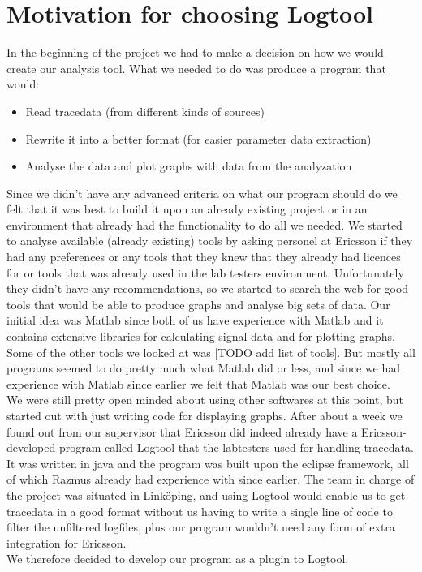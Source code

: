 \documentclass[cropmarks, frame, english]{idamasterthesis}
\begin{document}
\section{Motivation for choosing Logtool}
In the beginning of the project we had to make a decision on how we would create our analysis tool.
What we needed to do was produce a program that would:
\begin{itemize}
\item Read tracedata (from different kinds of sources)
\item Rewrite it into a better format (for easier parameter data extraction)
\item  Analyse the data and plot graphs with data from the analyzation
\end{itemize} 
Since we didn't have any advanced criteria on what our program should do we felt that it was best to build it upon an already existing project or in an environment that already had the functionality to do all we needed. \newline
We started to analyse available (already existing) tools by asking personel at Ericsson if they had any preferences or any tools that they knew that they already had licences for or tools that was already used in the lab testers environment. Unfortunately they didn't have any recommendations, so we started to search the web for good tools that would be able to produce graphs and analyse big sets of data. Our initial idea was Matlab since both of us have experience with Matlab and it contains extensive libraries for calculating signal data and for plotting graphs. Some of the other tools we looked at was [TODO add list of tools]. But mostly all programs seemed to do pretty much what Matlab did or less, and since we had experience with Matlab since earlier we felt that Matlab was our best choice. \\
We were still pretty open minded about using other softwares at this point, but started out with just writing code for displaying graphs. After about a week we found out from our supervisor that Ericsson did indeed already have a Ericsson-developed program called Logtool that the labtesters used for handling tracedata. It was written in java and the program was built upon the eclipse framework, all of which Razmus already had experience with since earlier. The team in charge of the project was situated in Linköping, and using Logtool would enable us to get tracedata in a good format without us having to write a single line of code to filter the unfiltered logfiles, plus our program wouldn't need any form of extra integration for Ericsson.\\
We therefore decided to develop our program as a plugin to Logtool. 
\end{document}
